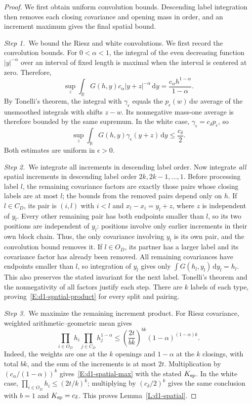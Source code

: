 \documentclass[12pt,oneside,openany]{book}
\numberwithin{equation}{section}
\theoremstyle{nogostyle}
\theoremstyle{definition}
\newcommand{\R}{\mathbb{R}}
\newcommand{\ud}{\,\mathrm{d}}
\begin{document}
\begin{proof}
  We first obtain uniform convolution bounds. Descending label integration
  then removes each closing covariance and opening mass in order, and an
  increment maximum gives the final spatial bound.


  \medskip
  \noindent\textit{Step 1.~}We bound the Riesz and white convolutions.
  We first record the convolution bounds. For $0 < \alpha < 1$, the
  integral of the even decreasing function $|y|^{-\alpha}$ over an
  interval of fixed length is maximal when the interval is centered
  at zero. Therefore,
  \[
    \sup_z\int_\R G(h,y)c_\alpha|y+z|^{-\alpha}\ud y
    =\frac{c_\alpha h^{1-\alpha}}{1-\alpha}.
  \]
  By Tonelli's theorem, the integral with $\gamma_\epsilon$ equals the
  $p_\epsilon(w)\ud w$ average of the unsmoothed integrals with shifts $z-w$.
  Its nonnegative mass-one average is therefore bounded by the same supremum. In
  the white case, $\gamma_\epsilon = c_\delta p_\epsilon$, so
  \[
    \sup_z\int_\R G(h,y)\gamma_\epsilon(y+z)\ud y
    \le\frac{c_\delta}{2}.
  \]
  Both estimates are uniform in $\epsilon > 0$.


  \medskip
  \noindent\textit{Step 2.~}We integrate all increments in descending label
  order.
  Now integrate \emph{all} spatial increments in descending label order
  $2k,2k-1,\ldots,1$. Before processing label $l$, the remaining covariance
  factors are exactly those pairs whose closing labels are at most $l$; the
  bounds from the removed pairs depend only on $h$. If $l \in C_D$, its pair is
  $(i,l)$ with $i < l$ and $x_l-x_i = y_l+z$, where $z$ is independent of $y_l$.
  Every other remaining pair has both endpoints smaller than $l$, so its two
  positions are independent of $y_l$: positions involve only earlier increments
  in their own block chain. Thus, the only covariance involving $y_l$ is its own
  pair, and the convolution bound removes it. If $l \in O_D$, its partner has a
  larger label and its covariance factor has already been removed. All remaining
  covariances have endpoints smaller than $l$, so integration of $y_l$ gives
  only $\int G(h_l,y_l)\ud y_l = h_l$. This also preserves the stated invariant
  for the next label. Tonelli's theorem and the nonnegativity of all factors
  justify each step. There are $k$ labels of each type,
  proving~\eqref{E:d1-spatial-product} for every split and pairing.


  \medskip
  \noindent\textit{Step 3.~}We maximize the remaining increment product.
  For Riesz covariance, weighted arithmetic--geometric mean gives
  \[
    \prod_{i\in O_D}h_i\prod_{j\in C_D}h_j^{1-\alpha}
    \le\left(\frac{2t}{bk}\right)^{bk}
    (1-\alpha)^{(1-\alpha)k}.
  \]
  Indeed, the weights are one at the $k$ openings and $1-\alpha$ at the $k$
  closings, with total $bk$, and the sum of the increments is at most $2t$.
  Multiplication by $(c_\alpha/(1-\alpha))^k$ gives~\eqref{E:d1-spatial-max}
  with the stated $K_{\rm sp}$. In the white case, $\prod_{i\in O_D}h_i \le
  (2t/k)^k$; multiplying by $(c_\delta/2)^k$ gives the same conclusion with $b =
  1$ and $K_{\rm sp} = c_\delta$. This proves Lemma~\ref{L:d1-spatial}.
\end{proof}
\end{document}
